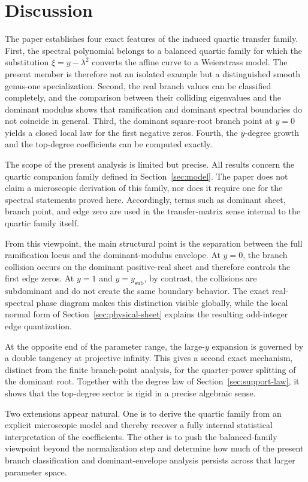 \section{Discussion}\label{sec:discussion-new}

The paper establishes four exact features of the induced quartic transfer family.
First, the spectral polynomial belongs to a balanced quartic family for which the substitution \(\xi=y-\lambda^2\) converts the affine curve to a Weierstrass model.
The present member is therefore not an isolated example but a distinguished smooth genus-one specialization.
Second, the real branch values can be classified completely, and the comparison between their colliding eigenvalues and the dominant modulus shows that ramification and dominant spectral boundaries do not coincide in general.
Third, the dominant square-root branch point at \(y=0\) yields a closed local law for the first negative zeros.
Fourth, the \(y\)-degree growth and the top-degree coefficients can be computed exactly.

The scope of the present analysis is limited but precise.
All results concern the quartic companion family defined in Section~\ref{sec:model}.
The paper does not claim a microscopic derivation of this family, nor does it require one for the spectral statements proved here.
Accordingly, terms such as dominant sheet, branch point, and edge zero are used in the transfer-matrix sense internal to the quartic family itself.

From this viewpoint, the main structural point is the separation between the full ramification locus and the dominant-modulus envelope.
At \(y=0\), the branch collision occurs on the dominant positive-real sheet and therefore controls the first edge zeros.
At \(y=1\) and \(y=y_{\mathrm{sub}}\), by contrast, the collisions are subdominant and do not create the same boundary behavior.
The exact real-spectral phase diagram makes this distinction visible globally, while the local normal form of Section~\ref{sec:physical-sheet} explains the resulting odd-integer edge quantization.

At the opposite end of the parameter range, the large-\(y\) expansion is governed by a double tangency at projective infinity.
This gives a second exact mechanism, distinct from the finite branch-point analysis, for the quarter-power splitting of the dominant root.
Together with the degree law of Section~\ref{sec:support-law}, it shows that the top-degree sector is rigid in a precise algebraic sense.

Two extensions appear natural.
One is to derive the quartic family from an explicit microscopic model and thereby recover a fully internal statistical interpretation of the coefficients.
The other is to push the balanced-family viewpoint beyond the normalization step and determine how much of the present branch classification and dominant-envelope analysis persists across that larger parameter space.
